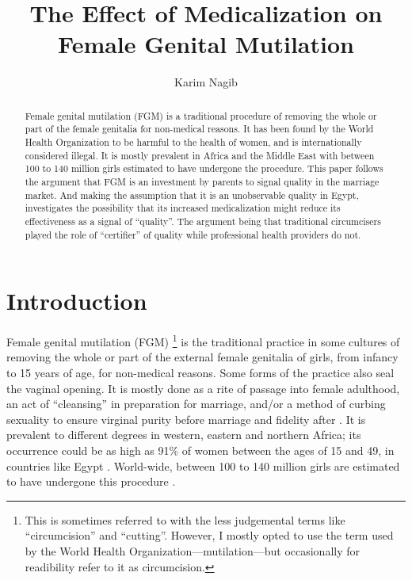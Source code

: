 \documentclass[12pt]{article}
\title{The Effect of Medicalization on Female Genital Mutilation}
\author{Karim Nagib}
\begin{document}
\maketitle

  \begin{abstract}
    Female genital mutilation (FGM) is a traditional procedure of removing the whole or part of the female genitalia for non-medical reasons.  It has been found by the World Health Organization to be harmful to the health of women, and is internationally considered illegal.  It is mostly prevalent in Africa and the Middle East with between 100 to 140 million girls estimated to have undergone the procedure.  This paper follows the argument that FGM is an investment by parents to signal quality in the marriage market. And making the assumption that it is an unobservable quality in Egypt, investigates the possibility that its increased medicalization might reduce its effectiveness as a signal of ``quality''.  The argument being that traditional circumcisers played the role of ``certifier'' of quality while professional health providers do not.
  \end{abstract}

\section{Introduction}

Female genital mutilation (FGM) \footnote{This is sometimes referred to with the less judgemental terms like ``circumcision'' and ``cutting''. However, I mostly opted to use the term used by the World Health Organization---mutilation---but occasionally for readibility refer to it as circumcision.} is the traditional practice in some cultures of removing the whole or part of the external female genitalia of girls, from infancy to 15 years of age, for non-medical reasons. Some forms of the practice also seal the vaginal opening. It is mostly done as a rite of passage into female adulthood, an act of ``cleansing'' in preparation for marriage, and/or a method of curbing sexuality to ensure virginal purity before marriage and fidelity after \citep{whofs241}. It is prevalent to different degrees in western, eastern and northern Africa; its occurrence could be as high as 91\% of women between the ages of 15 and 49, in countries like Egypt \citep{whoprev, El-Zanat}. World-wide, between 100 to 140 million girls are estimated to have undergone this procedure \citep{whofs241}.
\end{document}
